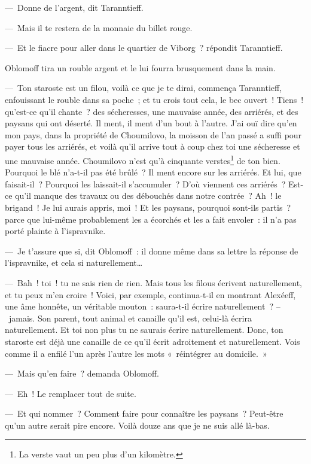 \documentclass[french,twoside]{book} %
\begin{document}
— Donne de l’argent, dit Taranntieff.\par
— Mais il te restera de la monnaie du billet rouge.\par
— Et le fiacre pour aller dans le quartier de Viborg ? répondit Taranntieff.\par
Oblomoff tira un rouble argent et le lui fourra brusquement dans la main.\par
— Ton staroste est un filou, voilà ce que je te dirai, commença Taranntieff, enfouissant le rouble dans sa poche ; et tu crois tout cela, le bec ouvert ! Tiens ! qu’est-ce qu’il chante ? des sécheresses, une mauvaise année, des arriérés, et des paysans qui ont déserté. Il ment, il ment d’un bout à l’autre. J’ai ouï dire qu’en mon pays, dans la propriété de Choumilovo, la moisson de l’an passé a suffi pour payer tous les arriérés, et voilà qu’il arrive tout à coup chez toi une sécheresse et une mauvaise année. Choumilovo n’est qu’à cinquante verstes\footnote{La verste vaut un peu plus d’un kilomètre.} de ton bien. Pourquoi le blé n’a-t-il pas été brûlé ? Il ment encore sur les arriérés. Et lui, que faisait-il ? Pourquoi les laissait-il s’accumuler ? D’où viennent ces arriérés ? Est-ce qu’il manque des travaux ou des débouchés dans notre contrée ? Ah ! le brigand ! Je lui aurais appris, moi ! Et les paysans, pourquoi sont-ils partis ? parce que lui-même probablement les a écorchés et les a fait envoler : il n’a pas porté plainte à l’ispravnike.\par
— Je t’assure que si, dit Oblomoff : il donne même dans sa lettre la réponse de l’ispravnike, et cela si naturellement…\par
— Bah ! toi ! tu ne sais rien de rien. Mais tous les filous écrivent naturellement, et tu peux m’en croire ! Voici, par exemple, continua-t-il en montrant Alexéeff, une âme honnête, un véritable mouton : saura-t-il écrire naturellement ? – jamais. Son parent, tout animal et canaille qu’il est, celui-là écrira naturellement. Et toi non plus tu ne saurais écrire naturellement. Donc, ton staroste est déjà une canaille de ce qu’il écrit adroitement et naturellement. Vois comme il a enfilé l’un après l’autre les mots « réintégrer au domicile. »\par
— Mais qu’en faire ? demanda Oblomoff.\par
— Eh ! Le remplacer tout de suite.\par
— Et qui nommer ? Comment faire pour connaître les paysans ? Peut-être qu’un autre serait pire encore. Voilà douze ans que je ne suis allé là-bas.\par
\end{document}
